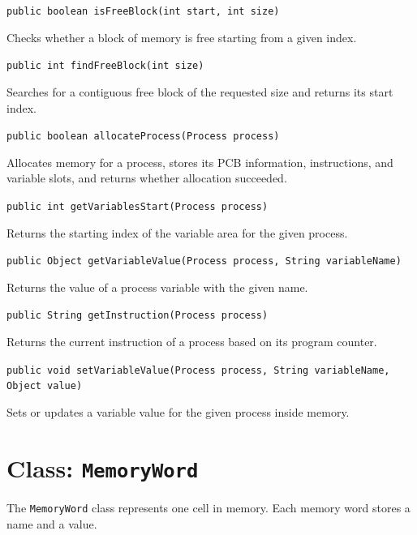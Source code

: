 \documentclass[12pt,a4paper]{article}
\begin{document}
\begin{signaturebox}
\texttt{public boolean isFreeBlock(int start, int size)}
\end{signaturebox}
Checks whether a block of memory is free starting from a given index.

\begin{signaturebox}
\texttt{public int findFreeBlock(int size)}
\end{signaturebox}
Searches for a contiguous free block of the requested size and returns its start index.

\begin{signaturebox}
\texttt{public boolean allocateProcess(Process process)}
\end{signaturebox}
Allocates memory for a process, stores its PCB information, instructions, and variable slots, and returns whether allocation succeeded.

\begin{signaturebox}
\texttt{public int getVariablesStart(Process process)}
\end{signaturebox}
Returns the starting index of the variable area for the given process.

\begin{signaturebox}
\texttt{public Object getVariableValue(Process process, String variableName)}
\end{signaturebox}
Returns the value of a process variable with the given name.

\begin{signaturebox}
\texttt{public String getInstruction(Process process)}
\end{signaturebox}
Returns the current instruction of a process based on its program counter.

\begin{signaturebox}
\texttt{public void setVariableValue(Process process, String variableName, Object value)}
\end{signaturebox}
Sets or updates a variable value for the given process inside memory.

\section{Class: \texttt{MemoryWord}}

\begin{purposebox}
The \texttt{MemoryWord} class represents one cell in memory. Each memory word stores a name and a value.
\end{purposebox}
\end{document}
